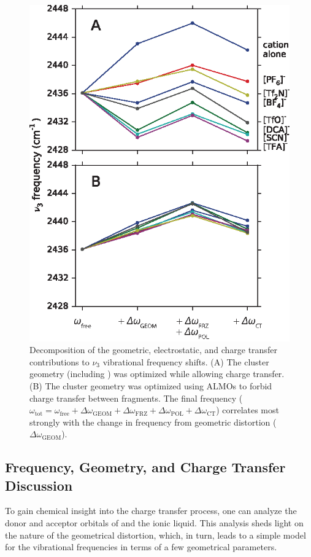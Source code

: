 {\begin{figure}
  \centering
  \includegraphics[scale=1.50]{./paper_01/fig4.eps}
  \caption[ALMO decomposition of carbon dioxide frequency]{\label{fig:decomposition}Decomposition of the geometric, electrostatic, and charge transfer contributions to  \(\nu_3\) vibrational frequency shifts. (A) The cluster geometry (including ) was optimized while allowing charge transfer. (B) The cluster geometry was optimized using ALMOs to forbid charge transfer between fragments. The final frequency ($\omega_\mathrm{tot} = \omega_\mathrm{free} + \Delta \omega_\mathrm{GEOM} + \Delta \omega_\mathrm{FRZ} + \Delta \omega_\mathrm{POL} + \Delta \omega_\mathrm{CT}$) correlates most strongly with the change in frequency from geometric distortion (\(\Delta \omega_\mathrm{GEOM}\)).}
\end{figure}

\subsection{Frequency, Geometry, and  Charge Transfer Discussion}
\label{sec:freq-geom_disc}
To gain chemical insight into the charge transfer process, one can analyze the donor and acceptor orbitals of  and the ionic liquid. This analysis sheds light on the nature of the geometrical distortion, which, in turn, leads to a simple model for the vibrational frequencies in terms of a few geometrical parameters.

}
